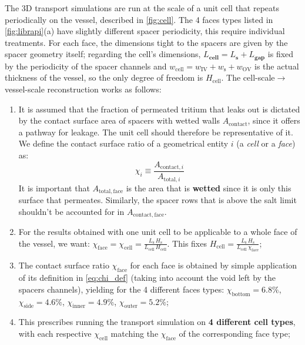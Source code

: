 \documentclass[a4paper,11pt,oneside]{report}
\begin{document}
The 3D transport simulations are run at the scale of a unit cell that repeats periodically on the vessel, described in \cref{fig:cell}. The 4 faces types listed in \cref{fig:librapi}(a) have slightly different spacer periodicity, this require individual treatments. For each face, the dimensions tight to the spacers are given by the spacer geometry itself; regarding the cell's dimensions, $L_\mathbf{cell}=L_\mathbf{s}+L_\mathbf{gap}$ is fixed by the periodicity of the spacer channels and $w_\mathrm{cell}=w_\mathrm{IV}+w_\mathrm{s}+w_\mathrm{OV}$ is the actual thickness of the vessel, so the only degree of freedom is $H_\mathrm{cell}$. The cell-scale$\rightarrow$vessel-scale reconstruction works as follows:
\begin{enumerate}
    \item It is assumed that the fraction of permeated tritium that leaks out is dictated by the contact surface area of spacers with wetted walls $A_{\mathrm{contact}}$, since it offers a pathway for leakage. The unit cell should therefore be representative of it. We define the contact surface ratio of a geometrical entity $i$ (a \textit{cell} or a \textit{face}) as:
    \begin{equation}
    \label{eq:chi_def}
        \chi_i\equiv\frac{A_{\mathrm{contact},i}}{A_{\mathrm{total},i}}
    \end{equation}
    It is important that ${A_{\mathrm{total,face}}}$ is the area that is \textbf{wetted} since it is only this surface that permeates. Similarly, the spacer rows that is above the salt limit shouldn't be accounted for in ${A_{\mathrm{contact,face}}}$.
    \item For the results obtained with one unit cell to be applicable to a whole face of the vessel, we want: $ \chi_\mathrm{face}=\chi_\mathrm{cell}=\frac{L_\mathrm{s}\,H_\mathrm{s}}{L_\mathrm{cell}\,H_\mathrm{cell}}$. This fixes $H_\mathrm{cell}=\frac{L_\mathrm{s}\,H_\mathrm{s}}{L_\mathrm{cell}\,\chi_\mathrm{face}}$;
    \item The contact surface ratio $\chi_\mathrm{face}$ for each face is obtained by simple application of its definition in \cref{eq:chi_def} (taking into account the void left by the spacers channels), yielding for the 4 different faces types: $\chi_\mathrm{bottom}=6.8\%$, $\chi_\mathrm{side}=4.6\%$, $\chi_\mathrm{inner}=4.9\%$, $\chi_\mathrm{outer}=5.2\%$;
    \item This prescribes running the transport simulation on \textbf{4 different cell types}, with each respective $\chi_\mathrm{cell}$ matching the $\chi_\mathrm{face}$ of the corresponding face type;

\end{enumerate}
\end{document}
